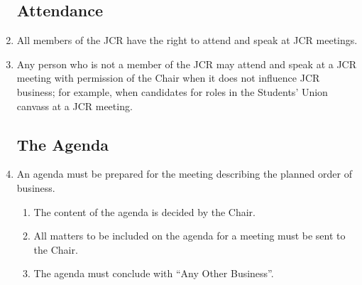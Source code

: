 \documentclass[12pt]{article}  %
\begin{document}
\begin{enumerate}
	\subsection{Attendance}
	\item All members of the JCR have the right to attend and speak at JCR meetings.
	\item Any person who is not a member of the JCR may attend and speak at a JCR meeting with permission of the Chair when it does not influence JCR business; for example, when candidates for roles in the Students’ Union canvass at a JCR meeting.
	\subsection{The Agenda}
	\item An agenda must be prepared for the meeting describing the planned order of business.
	\begin{enumerate}
		\item The content of the agenda is decided by the Chair.
		\item All matters to be included on the agenda for a meeting must be sent to the Chair.
		\item The agenda must conclude with “Any Other Business”.
	\end{enumerate}

\end{enumerate}
\end{document}
